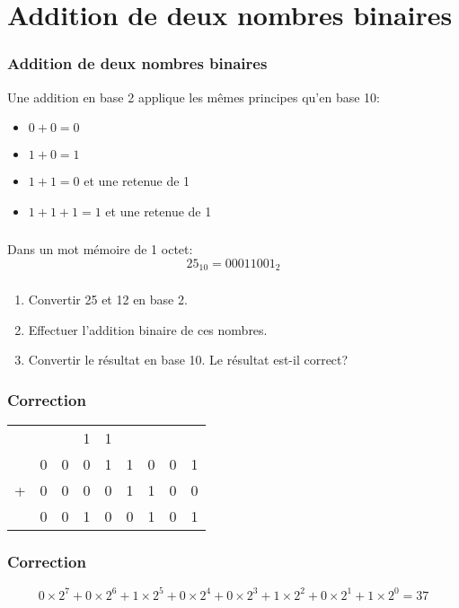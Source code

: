 \documentclass[svgnames,11pt]{beamer}
\begin{document}
\section{Addition de deux nombres binaires}
\begin{frame}
    \frametitle{Addition de deux nombres binaires}

    Une addition en base 2 applique les mêmes principes qu'en base 10:
    \begin{itemize}
        \item $0 + 0 = 0$
        \item $1 + 0 = 1$
        \item $1 + 1 = 0$ et une retenue de 1
        \item $1 + 1 + 1 = 1$ et une retenue de 1
    \end{itemize}

\end{frame}
\begin{frame}
    \frametitle{}

    Dans un mot mémoire de 1 octet:
    $$25_{10} = 00011001_2$$
\end{frame}
\begin{frame}
    \frametitle{}

    \begin{activite}
        \begin{enumerate}
            \item Convertir 25 et 12 en base 2.
            \item Effectuer l'addition binaire de ces nombres.
            \item Convertir le résultat en base 10. Le résultat est-il correct?
        \end{enumerate}
    \end{activite}

\end{frame}
\begin{frame}
    \frametitle{Correction}

    \begin{center}
        \begin{tabular}{*{9}{c}}
              &   &   & {\small 1} & {\small 1} &   &   &   &   \\
              & 0 & 0 & 0          & 1          & 1 & 0 & 0 & 1 \\
            + & 0 & 0 & 0          & 0          & 1 & 1 & 0 & 0 \\
            \hline
              & 0 & 0 & 1          & 0          & 0 & 1 & 0 & 1 \\
        \end{tabular}
    \end{center}

\end{frame}
\begin{frame}
    \frametitle{Correction}

    $$0×2^7+0×2^6+1×2^5+0×2^4+0×2^3+1×2^2+0×2^1+1×2^0=37$$

\end{frame}
\end{document}
